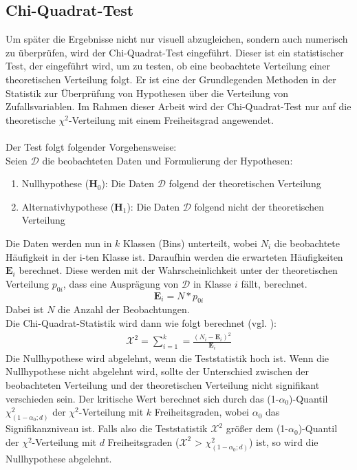 \documentclass[%
thesis=student,%
coverpage=false,%
titlepage=false,%
headmarks=true, %
german,%
font=libertine, %
math=newpxtx, %
BCOR=5mm,%
coverBCOR=11mm%
]{tumbook}
\theoremstyle{break}
\begin{document}
\subsection{Chi-Quadrat-Test}
Um später die Ergebnisse nicht nur visuell abzugleichen, sondern auch numerisch zu überprüfen, wird der Chi-Quadrat-Test eingeführt. Dieser ist ein statistischer Test, der eingeführt wird, um zu testen, ob eine beobachtete Verteilung einer theoretischen Verteilung folgt. Er ist eine der Grundlegenden Methoden in der Statistik zur Überprüfung von Hypothesen über die Verteilung von Zufallsvariablen. Im Rahmen dieser Arbeit wird der Chi-Quadrat-Test nur auf die theoretische $\chi^2$-Verteilung mit einem Freiheitsgrad angewendet.\\
\\
Der Test folgt folgender Vorgehensweise:\\
Seien $\mathcal{D}$ die beobachteten Daten und 
Formulierung der Hypothesen: 
\begin{enumerate}
	\item Nullhypothese ($\mathbf{H}_0$): Die Daten $\mathcal{D}$ folgend der theoretischen Verteilung\\
	\item Alternativhypothese ($\mathbf{H}_1$): Die Daten $\mathcal{D}$ folgend nicht der theoretischen Verteilung \\
\end{enumerate}
Die Daten werden nun in  $k$ Klassen (Bins) unterteilt, wobei $N_i$ die beobachtete Häufigkeit in der i-ten Klasse ist. Daraufhin werden die erwarteten Häufigkeiten $\mathbf{E}_i$ berechnet. Diese werden mit der Wahrscheinlichkeit unter der theoretischen Verteilung $p_{0i}$, dass eine Ausprägung von $\mathcal{D}$ in Klasse $i$ fällt, berechnet. \\
$$ \mathbf{E}_i = N * p_{0i}$$
Dabei ist $N$ die Anzahl der Beobachtungen.\\
Die Chi-Quadrat-Statistik wird dann wie folgt berechnet (vgl. \cite{Chi-Quadrat-Test}):\\
\begin{align}
	\mathcal{X}^2 = \sum_{i=1}^{k} = \frac{(N_i - \mathbf{E}_i)^2}{\mathbf{E}_i} \label{Chi-Quadrat-Test}
\end{align}
Die Nullhypothese wird abgelehnt, wenn die Teststatistik hoch ist. Wenn die Nullhypothese nicht abgelehnt wird, sollte der Unterschied zwischen der beobachteten Verteilung und der theoretischen Verteilung nicht signifikant verschieden sein. Der kritische Wert berechnet sich durch das (1-$\alpha_0$)-Quantil $\chi^2_{(1-\alpha_0; d)}$ der $\chi^2$-Verteilung mit $k$ Freiheitsgraden, wobei $\alpha_0$ das Signifikanzniveau ist. Falls also die Teststatistik $\mathcal{X}^2$ größer dem (1-$\alpha_0$)-Quantil der $\chi^2$-Verteilung mit $d$ Freiheitsgraden ($\mathcal{X}^2$ > $\chi^2_{(1-\alpha_0; d)}$) ist, so wird die Nullhypothese abgelehnt. 
\end{document}
